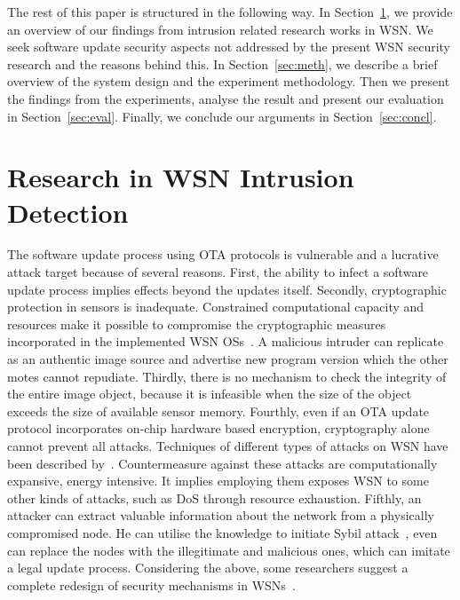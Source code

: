 \documentclass[conference,final]{IEEEtran}
\begin{document}
The rest of this paper is structured in the following way. 
In Section~\ref{sec:lit},  
we provide an overview of our findings from
intrusion related research works in WSN. We seek software
update security aspects not addressed by the present WSN
security research and the reasons behind this.  
In Section~\ref{sec:meth}, we describe a brief overview of the system design and the experiment methodology. Then we present the findings from the
experiments, analyse the result and present our evaluation in
Section~\ref{sec:eval}.  
Finally, we conclude our arguments in Section~\ref{sec:concl}.

\section{Research in WSN Intrusion Detection}
\label{sec:lit}


The software update process using OTA protocols is vulnerable
and a lucrative attack target because of several reasons. First,
the ability to infect a software update process implies effects
beyond the updates itself. Secondly, cryptographic protection in
sensors is inadequate. Constrained computational capacity and
resources make it possible to compromise the cryptographic
measures incorporated in the implemented WSN OSs~\cite{aes2011}.
A  malicious intruder can replicate as an authentic
image source and advertise new program version which the
other motes cannot repudiate.
Thirdly, there is no mechanism to check the integrity of the entire
image object, because it is infeasible when the size of the object exceeds
the size of available sensor memory.
Fourthly, even if an OTA update protocol incorporates on-chip hardware based encryption,
cryptography alone cannot prevent all attacks. 
Techniques of
different types of attacks on WSN have been described by~\cite{DBLP:journals/corr/abs-1301-3022}. Countermeasure against these attacks are computationally
expansive, energy intensive. It implies employing them exposes
WSN to some other kinds of attacks, such as DoS through
resource exhaustion. 
Fifthly, an attacker can extract valuable
information about the network from a physically compromised
node. He can utilise the knowledge to initiate Sybil attack~\cite{syb02}, even
can replace the nodes with the illegitimate and malicious ones,
which can imitate a legal update process. Considering the above, some researchers suggest a complete redesign
of security mechanisms in WSNs~\cite{quing09}.
\end{document}
